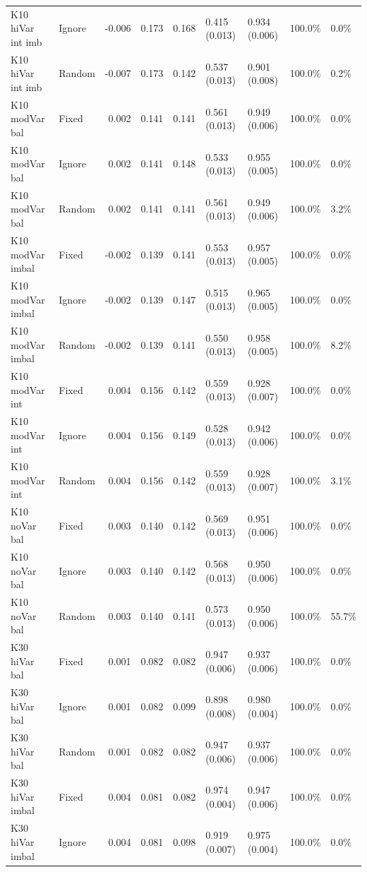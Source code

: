 \documentclass[
  11pt,
]{article}
\begin{document}
\begin{table}[!h]
{\begin{tabular}[t]{llrrrllll}
K10 hiVar int imb & Ignore & -0.006 & 0.173 & 0.168 & 0.415 (0.013) & 0.934 (0.006) & 100.0\% & 0.0\%\\
K10 hiVar int imb & Random & -0.007 & 0.173 & 0.142 & 0.537 (0.013) & 0.901 (0.008) & 100.0\% & 0.2\%\\
K10 modVar bal & Fixed & 0.002 & 0.141 & 0.141 & 0.561 (0.013) & 0.949 (0.006) & 100.0\% & 0.0\%\\
K10 modVar bal & Ignore & 0.002 & 0.141 & 0.148 & 0.533 (0.013) & 0.955 (0.005) & 100.0\% & 0.0\%\\
K10 modVar bal & Random & 0.002 & 0.141 & 0.141 & 0.561 (0.013) & 0.949 (0.006) & 100.0\% & 3.2\%\\
K10 modVar imbal & Fixed & -0.002 & 0.139 & 0.141 & 0.553 (0.013) & 0.957 (0.005) & 100.0\% & 0.0\%\\
K10 modVar imbal & Ignore & -0.002 & 0.139 & 0.147 & 0.515 (0.013) & 0.965 (0.005) & 100.0\% & 0.0\%\\
K10 modVar imbal & Random & -0.002 & 0.139 & 0.141 & 0.550 (0.013) & 0.958 (0.005) & 100.0\% & 8.2\%\\
K10 modVar int & Fixed & 0.004 & 0.156 & 0.142 & 0.559 (0.013) & 0.928 (0.007) & 100.0\% & 0.0\%\\
K10 modVar int & Ignore & 0.004 & 0.156 & 0.149 & 0.528 (0.013) & 0.942 (0.006) & 100.0\% & 0.0\%\\
K10 modVar int & Random & 0.004 & 0.156 & 0.142 & 0.559 (0.013) & 0.928 (0.007) & 100.0\% & 3.1\%\\
K10 noVar bal & Fixed & 0.003 & 0.140 & 0.142 & 0.569 (0.013) & 0.951 (0.006) & 100.0\% & 0.0\%\\
K10 noVar bal & Ignore & 0.003 & 0.140 & 0.142 & 0.568 (0.013) & 0.950 (0.006) & 100.0\% & 0.0\%\\
K10 noVar bal & Random & 0.003 & 0.140 & 0.141 & 0.573 (0.013) & 0.950 (0.006) & 100.0\% & 55.7\%\\
K30 hiVar bal & Fixed & 0.001 & 0.082 & 0.082 & 0.947 (0.006) & 0.937 (0.006) & 100.0\% & 0.0\%\\
K30 hiVar bal & Ignore & 0.001 & 0.082 & 0.099 & 0.898 (0.008) & 0.980 (0.004) & 100.0\% & 0.0\%\\
K30 hiVar bal & Random & 0.001 & 0.082 & 0.082 & 0.947 (0.006) & 0.937 (0.006) & 100.0\% & 0.0\%\\
K30 hiVar imbal & Fixed & 0.004 & 0.081 & 0.082 & 0.974 (0.004) & 0.947 (0.006) & 100.0\% & 0.0\%\\
K30 hiVar imbal & Ignore & 0.004 & 0.081 & 0.098 & 0.919 (0.007) & 0.975 (0.004) & 100.0\% & 0.0\%\\

\end{tabular}}
\end{table}
\end{document}
